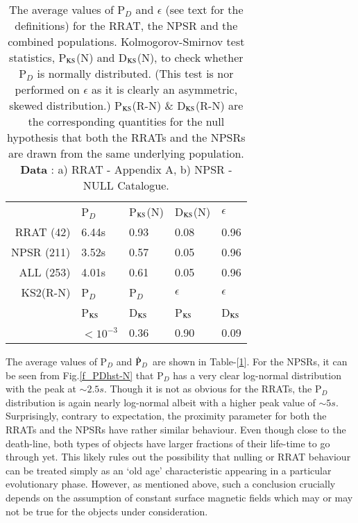 \documentclass{jaa}
\newcommand{\pdot}{\mbox{$\dot {\rm P}$}}
\begin{document}
%
\begin{table} 
%
\centering
\begin{tabular}{rllll} \toprule
  & P$_D$ & P$_{\rm KS}$(N) & D$_{\rm KS}$(N) & $\epsilon$ \\ 
RRAT (42)
  & 6.44s & 0.93         & 0.08          & 0.96      \\ 
NPSR (211)
  & 3.52s & 0.57         & 0.05          & 0.96      \\ 
ALL (253)
  & 4.01s & 0.61         & 0.05          & 0.96      \\ \midrule
\midrule
KS2(R-N)  & P$_D$        & P$_D$         & $\epsilon$ & $\epsilon$ \\
  & P$_{\rm KS}$ & D$_{\rm KS}$ & P$_{\rm KS}$ & D$_{\rm KS}$ \\ 
  & $< 10^{-3}$   & 0.36 & 0.90 & 0.09 \\ \bottomrule 
\end{tabular}
% 
\caption{The average values of P$_D$  and $\epsilon$ (see text for the
  definitions)   for   the   RRAT,   the   NPSR   and   the   combined
  populations. Kolmogorov-Smirnov test statistics, P$_{\rm KS}$(N) and
  D$_{\rm  KS}$(N), to  check whether  P$_D$ is  normally distributed.
  (This  test is  nor  performed on  $\epsilon$ as  it  is clearly  an
  asymmetric,  skewed  distribution.)   P$_{\rm KS}$(R-N)  \&  D$_{\rm
    KS}$(R-N) are the corresponding quantities for the null hypothesis
  that both the RRATs and the NPSRs are drawn from the same underlying
  population.   {\bf Data}  : a)  RRAT -  Appendix A,  b) NPSR  - NULL
  Catalogue. }
%
\label{t_stat-II}
%  
\end{table}
%
The   average   values   of   P$_D$   and   \pdot$_D$~are   shown   in
Table-[\ref{t_stat-II}].   For   the  NPSRs,   it  can  be   seen  from
Fig.\ref{f_PDhst-N}   that  P$_D$   has   a   very  clear   log-normal
distribution with the peak at $\sim2.5 s$. Though it is not as obvious
for  the RRATs,  the  P$_D$ distribution  is  again nearly  log-normal
albeit with a  higher peak value of $\sim5  s$. Surprisingly, contrary
to expectation,  the proximity  parameter for both  the RRATs  and the
NPSRs  have  rather  similar  behaviour.  Even  though  close  to  the
death-line,  both types  of  objects have  larger  fractions of  their
life-time to  go through  yet. This likely  rules out  the possibility
that nulling or  RRAT behaviour can be treated simply  as an `old age'
characteristic appearing in a  particular evolutionary phase. However,
as  mentioned  above,  such  a conclusion  crucially  depends  on  the
assumption of constant surface magnetic fields which may or may not be
true for the objects under consideration.
\end{document}

